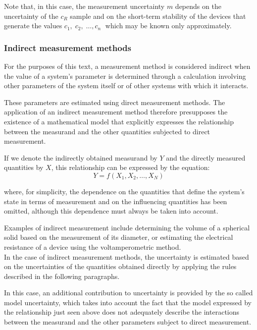 \documentclass[../main.tex]{subfiles}
\begin{document}
Note that, in this case, the measurement uncertainty $m$ depends on the uncertainty of the $c_R$ sample and on the short-term stability of the devices that generate the values $c_1,\;c_2,\;\dots, c_n\;$ which may be known only approximately.

\subsubsection{Indirect measurement methods}

For the purposes of this text, a measurement method is considered indirect when the value of a system’s parameter is determined through a calculation involving other parameters of the system itself or of other systems with which it interacts. 

These parameters are estimated using direct measurement methods. The application of an indirect measurement method therefore presupposes the existence of a mathematical model that explicitly expresses the relationship between the measurand and the other quantities subjected to direct measurement. 

If we denote the indirectly obtained measurand by $Y$ and the directly measured quantities by $X$, this relationship can be expressed by the equation:\\

\begin{equation}
	Y = f(X_1,X_2,\dots, X_N)
\end{equation}

where, for simplicity, the dependence on the quantities that define the system’s state in terms of measurement and on the influencing quantities has been omitted, although this dependence must always be taken into account.

Examples of indirect measurement include determining the volume of a spherical solid based on the measurement of its diameter, or estimating the electrical resistance of a device using the voltamperometric method.\\

In the case of indirect measurement methods, the uncertainty is estimated based on the uncertainties of the quantities obtained directly by applying the rules described in the following paragraphs. 

In this case, an additional contribution to uncertainty is provided by the so called model uncertainty, which takes into account the fact that the model expressed by the relationship just seen above does not adequately describe the interactions between the measurand and the other parameters subject to direct measurement. 
\end{document}
